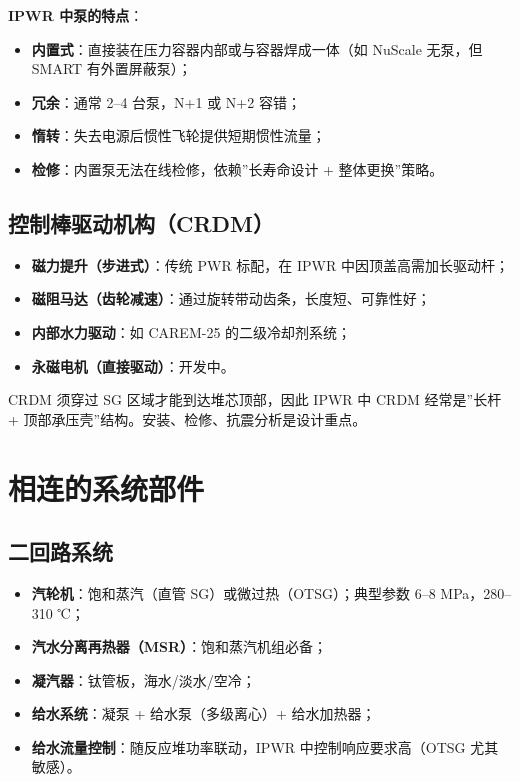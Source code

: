 \documentclass[
  UTF8,
  scheme=plain,
  fontsize=10pt,
  openany
]{ctexbook}
\begin{document}
\textbf{IPWR 中泵的特点}：

\begin{itemize}
\tightlist
\item
  \textbf{内置式}：直接装在压力容器内部或与容器焊成一体（如 NuScale
  无泵，但 SMART 有外置屏蔽泵）；
\item
  \textbf{冗余}：通常 2--4 台泵，N+1 或 N+2 容错；
\item
  \textbf{惰转}：失去电源后惯性飞轮提供短期惯性流量；
\item
  \textbf{检修}：内置泵无法在线检修，依赖''长寿命设计 + 整体更换''策略。
\end{itemize}

\subsection{控制棒驱动机构（CRDM）}\label{ux63a7ux5236ux68d2ux9a71ux52a8ux673aux6784crdm}

\begin{itemize}
\tightlist
\item
  \textbf{磁力提升（步进式）}：传统 PWR 标配，在 IPWR
  中因顶盖高需加长驱动杆；
\item
  \textbf{磁阻马达（齿轮减速）}：通过旋转带动齿条，长度短、可靠性好；
\item
  \textbf{内部水力驱动}：如 CAREM-25 的二级冷却剂系统；
\item
  \textbf{永磁电机（直接驱动）}：开发中。
\end{itemize}

CRDM 须穿过 SG 区域才能到达堆芯顶部，因此 IPWR 中 CRDM 经常是''长杆 +
顶部承压壳''结构。安装、检修、抗震分析是设计重点。

\section{相连的系统部件}\label{ux76f8ux8fdeux7684ux7cfbux7edfux90e8ux4ef6}

\subsection{二回路系统}\label{ux4e8cux56deux8defux7cfbux7edf}

\begin{itemize}
\tightlist
\item
  \textbf{汽轮机}：饱和蒸汽（直管 SG）或微过热（OTSG）；典型参数 6--8
  MPa，280--310 ℃；
\item
  \textbf{汽水分离再热器（MSR）}：饱和蒸汽机组必备；
\item
  \textbf{凝汽器}：钛管板，海水/淡水/空冷；
\item
  \textbf{给水系统}：凝泵 + 给水泵（多级离心）+ 给水加热器；
\item
  \textbf{给水流量控制}：随反应堆功率联动，IPWR 中控制响应要求高（OTSG
  尤其敏感）。
\end{itemize}
\end{document}
